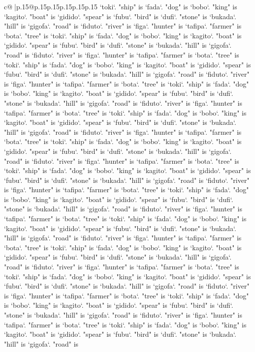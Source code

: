 \documentclass{article}
\begin{document}
{\begin{supertabular}{c@{$\;$}|p{.15\linewidth}@{}p{.15\linewidth}p{.15\linewidth}p{.15\linewidth}p{.15\linewidth}p{.15\linewidth}}
{{{`toki`. "ship" is `fada`. "dog" is `bobo`. "king" is `kagito`. "boat" is `gidido`. "spear" is `fubu`. "bird" is `dufi`. "stone" is `bukada`. "hill" is `gigofa`. "road" is `fiduto`. "river" is `figa`. "hunter" is `tafipa`. "farmer" is `bota`. "tree" is `toki`. "ship" is `fada`. "dog" is `bobo`. "king" is `kagito`. "boat" is `gidido`. "spear" is `fubu`. "bird" is `dufi`. "stone" is `bukada`. "hill" is `gigofa`. "road" is `fiduto`. "river" is `figa`. "hunter" is `tafipa`. "farmer" is `bota`. "tree" is `toki`. "ship" is `fada`. "dog" is `bobo`. "king" is `kagito`. "boat" is `gidido`. "spear" is `fubu`. "bird" is `dufi`. "stone" is `bukada`. "hill" is `gigofa`. "road" is `fiduto`. "river" is `figa`. "hunter" is `tafipa`. "farmer" is `bota`. "tree" is `toki`. "ship" is `fada`. "dog" is `bobo`. "king" is `kagito`. "boat" is `gidido`. "spear" is `fubu`. "bird" is `dufi`. "stone" is `bukada`. "hill" is `gigofa`. "road" is `fiduto`. "river" is `figa`. "hunter" is `tafipa`. "farmer" is `bota`. "tree" is `toki`. "ship" is `fada`. "dog" is `bobo`. "king" is `kagito`. "boat" is `gidido`. "spear" is `fubu`. "bird" is `dufi`. "stone" is `bukada`. "hill" is `gigofa`. "road" is `fiduto`. "river" is `figa`. "hunter" is `tafipa`. "farmer" is `bota`. "tree" is `toki`. "ship" is `fada`. "dog" is `bobo`. "king" is `kagito`. "boat" is `gidido`. "spear" is `fubu`. "bird" is `dufi`. "stone" is `bukada`. "hill" is `gigofa`. "road" is `fiduto`. "river" is `figa`. "hunter" is `tafipa`. "farmer" is `bota`. "tree" is `toki`. "ship" is `fada`. "dog" is `bobo`. "king" is `kagito`. "boat" is `gidido`. "spear" is `fubu`. "bird" is `dufi`. "stone" is `bukada`. "hill" is `gigofa`. "road" is `fiduto`. "river" is `figa`. "hunter" is `tafipa`. "farmer" is `bota`. "tree" is `toki`. "ship" is `fada`. "dog" is `bobo`. "king" is `kagito`. "boat" is `gidido`. "spear" is `fubu`. "bird" is `dufi`. "stone" is `bukada`. "hill" is `gigofa`. "road" is `fiduto`. "river" is `figa`. "hunter" is `tafipa`. "farmer" is `bota`. "tree" is `toki`. "ship" is `fada`. "dog" is `bobo`. "king" is `kagito`. "boat" is `gidido`. "spear" is `fubu`. "bird" is `dufi`. "stone" is `bukada`. "hill" is `gigofa`. "road" is `fiduto`. "river" is `figa`. "hunter" is `tafipa`. "farmer" is `bota`. "tree" is `toki`. "ship" is `fada`. "dog" is `bobo`. "king" is `kagito`. "boat" is `gidido`. "spear" is `fubu`. "bird" is `dufi`. "stone" is `bukada`. "hill" is `gigofa`. "road" is `fiduto`. "river" is `figa`. "hunter" is `tafipa`. "farmer" is `bota`. "tree" is `toki`. "ship" is `fada`. "dog" is `bobo`. "king" is `kagito`. "boat" is `gidido`. "spear" is `fubu`. "bird" is `dufi`. "stone" is `bukada`. "hill" is `gigofa`. "road" is `fiduto`. "river" is `figa`. "hunter" is `tafipa`. "farmer" is `bota`. "tree" is `toki`. "ship" is `fada`. "dog" is `bobo`. "king" is `kagito`. "boat" is `gidido`. "spear" is `fubu`. "bird" is `dufi`. "stone" is `bukada`. "hill" is `gigofa`. "road" is `fiduto`. "river" is `figa`. "hunter" is `tafipa`. "farmer" is `bota`. "tree" is `toki`. "ship" is `fada`. "dog" is `bobo`. "king" is `kagito`. "boat" is `gidido`. "spear" is `fubu`. "bird" is `dufi`. "stone" is `bukada`. "hill" is `gigofa`. "road" is }}}
\end{supertabular}}
\end{document}
